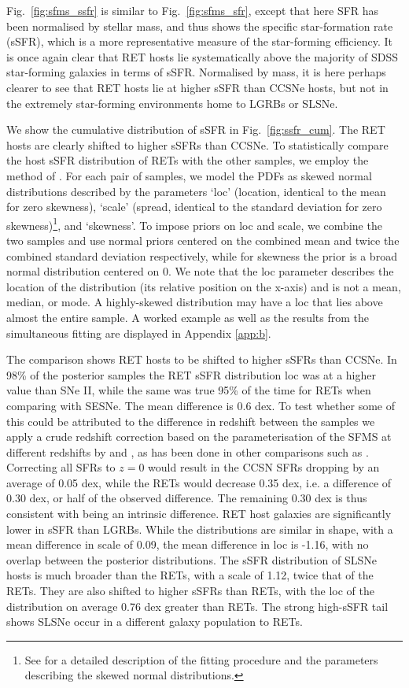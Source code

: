 \documentclass[fleqn,usenatbib,]{mnras}
\begin{document}
Fig.~\ref{fig:sfms_ssfr} is similar to Fig.~\ref{fig:sfms_sfr}, except that here SFR has been normalised by stellar mass, and thus shows the specific star-formation rate (sSFR), which is a more representative measure of the star-forming efficiency. It is once again clear that RET hosts lie systematically above the majority of SDSS star-forming galaxies in terms of sSFR. Normalised by mass, it is here perhaps clearer to see that RET hosts lie at higher sSFR than CCSNe hosts, but not in the extremely star-forming environments home to LGRBs or SLSNe.

We show the cumulative distribution of sSFR in Fig.~\ref{fig:ssfr_cum}. The RET hosts are clearly shifted to higher sSFRs than CCSNe. To statistically compare the host sSFR distribution of RETs with the other samples, we employ the method of . For each pair of samples, we model the PDFs as skewed normal distributions described by the parameters `loc' (location, identical to the mean for zero skewness), `scale' (spread, identical to the standard deviation for zero skewness)\footnote{See  for a detailed description of the fitting procedure and the parameters describing the skewed normal distributions.}, and `skewness'. To impose priors on loc and scale, we combine the two samples and use normal priors centered on the combined mean and twice the combined standard deviation respectively, while for skewness the prior is a broad normal distribution centered on 0. We note that the loc parameter describes the location of the distribution (its relative position on the x-axis) and is not a mean, median, or mode. A highly-skewed distribution may have a loc that lies above almost the entire sample. A worked example as well as the results from the simultaneous fitting are displayed in Appendix \ref{app:b}.

The comparison shows RET hosts to be shifted to higher sSFRs than CCSNe. In 98\% of the posterior samples the RET sSFR distribution loc was at a higher value than SNe II, while the same was true 95\% of the time for RETs when comparing with SESNe. The mean difference is 0.6 dex. To test whether some of this could be attributed to the difference in redshift between the samples we apply a crude redshift correction based on the parameterisation of the SFMS at different redshifts by \citet{Salim2007} and \citet{Noeske2007}, as has been done in other comparisons such as \citet{Taggart2019}. Correcting all SFRs to $z=0$ would result in the CCSN SFRs dropping by an average of 0.05 dex, while the RETs would decrease 0.35 dex, i.e. a difference of 0.30 dex, or half of the observed difference. The remaining 0.30 dex is thus consistent with being an intrinsic difference. 
RET host galaxies are significantly lower in sSFR than LGRBs. While the distributions are similar in shape, with a mean difference in scale of 0.09, the mean difference in loc is -1.16, with no overlap between the posterior distributions. The sSFR distribution of SLSNe hosts is much broader than the RETs, with a scale of 1.12, twice that of the RETs. They are also shifted to higher sSFRs than RETs, with the loc of the distribution on average 0.76 dex greater than RETs. The strong high-sSFR tail shows SLSNe occur in a different galaxy population to RETs.
\end{document}
